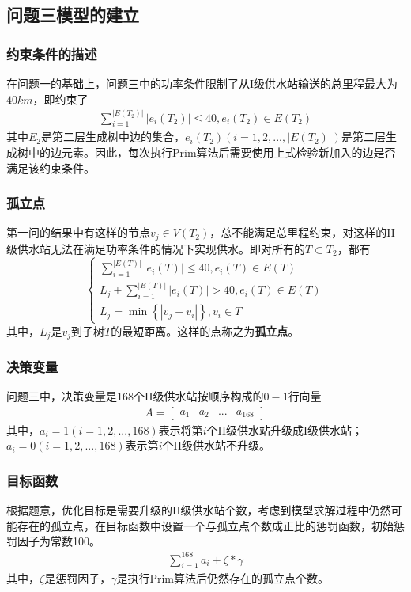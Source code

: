 \documentclass{whutmod}
\begin{document}
        \subsection{问题三模型的建立}
        \subsubsection{约束条件的描述}
        在问题一的基础上，问题三中的功率条件限制了从I级供水站输送的总里程最大为$40km$，即约束了
        \begin{gather}
        \sum_{i=1}^{|E(T_2)|}|e_i(T_2)|\leq 40,e_i(T_2)\in E(T_2)
        \end{gather}
        其中$E_2$是第二层生成树中边的集合，$e_i(T_2)(i=1,2,...,|E(T_2)|)$是第二层生成树中的边元素。因此，每次执行Prim算法后需要使用上式检验新加入的边是否满足该约束条件。
        \subsubsection{孤立点}
        第一问的结果中有这样的节点$v_j \in V(T_2)$，总不能满足总里程约束，对这样的II级供水站无法在满足功率条件的情况下实现供水。即对所有的$T \subset T_2$，都有
        $$
        \left\{\begin{matrix}
        \displaystyle \sum_{i=1}^{|E(T)|}|e_i(T)|\leq40,e_i(T)\in E(T)
        \\ 
        L_j+\displaystyle\sum_{i=1}^{|E(T)|}|e_i(T)|> 40,e_i(T)\in E(T)
        \\
        L_j=\min\left\{ |v_j-v_i|\right\},v_i \in T
        \end{matrix}\right.
        $$
        其中，$L_j$是$v_j$到子树$T$的最短距离。这样的点称之为\textbf{孤立点}。
        \subsubsection{决策变量}
        问题三中，决策变量是168个II级供水站按顺序构成的$0-1$行向量
        \begin{gather}
        A=
        \begin{bmatrix}
        a_1&a_2&...&a_{168}
        \end{bmatrix}
        \end{gather}
        其中，$a_i=1(i=1,2,...,168)$表示将第$i$个II级供水站升级成I级供水站；$a_i=0(i=1,2,...,168)$表示第$i$个II级供水站不升级。
        \subsubsection{目标函数}
        根据题意，优化目标是需要升级的II级供水站个数，考虑到模型求解过程中仍然可能存在的孤立点，在目标函数中设置一个与孤立点个数成正比的惩罚函数，初始惩罚因子为常数100。
        \begin{gather}
        \sum_{i=1}^{168}a_i+\zeta*\gamma
        \end{gather}
        其中，$\zeta$是惩罚因子，$\gamma$是执行Prim算法后仍然存在的孤立点个数。
\end{document}

